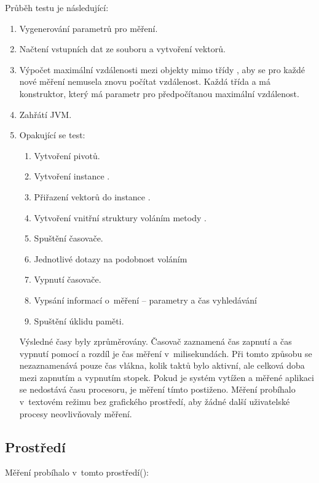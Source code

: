 Průběh testu je následující:

\begin{enumerate}
\item Vygenerování parametrů pro měření.
\item Načtení vstupních dat ze souboru a vytvoření vektorů.
\item Výpočet maximální vzdálenosti mezi objekty mimo třídy , aby se pro každé nové měření nemusela znovu počítat vzdálenost.
Každá třída  a \linebreak {} má konstruktor, který má parametr pro předpočítanou maximální vzdálenost.
\item Zahřátí JVM.
\item Opakující se test:
\begin{enumerate}
\item Vytvoření pivotů.
\item Vytvoření instance \type{\MIndex{}}.
\item Přiřazení vektorů do instance \type{\MIndex{}}.
\item Vytvoření vnitřní struktury  voláním metody .
\item Spuštění časovače.
\item Jednotlivé dotazy na podobnost voláním 
\item Vypnutí časovače.
\item Vypsání informací o~měření -- parametry a čas vyhledávání
\item Spuštění úklidu paměti.
\end{enumerate}

Výsledné časy byly zprůměrovány.
Časovač zaznamená čas zapnutí a čas vypnutí pomocí  a rozdíl je čas měření v~milisekundách.
Při tomto způsobu se nezaznamenává pouze čas vlákna, kolik taktů bylo aktivní, ale celková doba mezi zapnutím a vypnutím stopek.
Pokud je systém vytížen a měřené aplikaci se nedostává času procesoru, je měření tímto postiženo.
Měření probíhalo v~textovém režimu bez grafického prostředí, aby žádné další uživatelské procesy neovlivňovaly měření.

\end{enumerate}
\subsection{Prostředí}
Měření probíhalo v~tomto prostředí():

